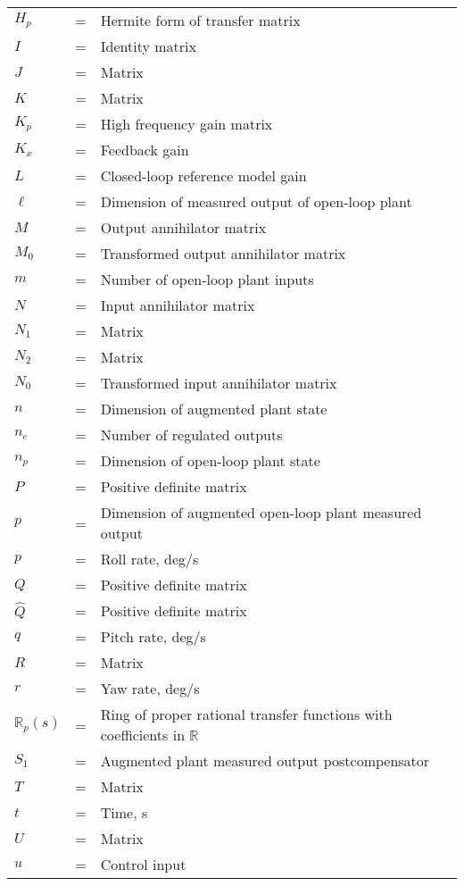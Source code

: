 \documentclass[]{../sty/JGCD}
\theoremstyle{examplestyle}
\begin{document}
\begin{longtable}[l]{@{}lcl@{}}
    $H_{p}$ &=& Hermite form of transfer matrix \\
    $I$ &=& Identity matrix \\
    $J$ &=& Matrix \\
    $K$ &=& Matrix \\
    $K_{p}$ &=& High frequency gain matrix \\
    $K_{x}$ &=& Feedback gain \\
    $L$ &=& Closed-loop reference model gain \\
    $\ell$ &=& Dimension of measured output of open-loop plant \\
    $M$ &=& Output annihilator matrix \\
    $M_{0}$ &=& Transformed output annihilator matrix \\
    $m$ &=& Number of open-loop plant inputs \\
    $N$ &=& Input annihilator matrix \\
    $N_{1}$ &=& Matrix \\
    $N_{2}$ &=& Matrix \\
    $N_{0}$ &=& Transformed input annihilator matrix \\
    $n$ &=& Dimension of augmented plant state \\
    $n_{e}$ &=& Number of regulated outputs \\
    $n_{p}$ &=& Dimension of open-loop plant state \\
    $P$ &=& Positive definite matrix \\
    $p$ &=& Dimension of augmented open-loop plant measured output \\
    $p$ &=& Roll rate, deg/s \\
    $Q$ &=& Positive definite matrix \\
    $\widehat{Q}$ &=& Positive definite matrix \\
    $q$ &=& Pitch rate, deg/s \\
    $R$ &=& Matrix \\
    $r$ &=& Yaw rate, deg/s \\
    $\mathbb{R}_{p}(s)$ &=& Ring of proper rational transfer functions with coefficients in $\mathbb{R}$ \\
    $S_{1}$ &=& Augmented plant measured output postcompensator \\
    $T$ &=& Matrix \\
    $t$ &=& Time, s \\
    $U$ &=& Matrix \\
    $u$ &=& Control input \\

\end{longtable}
\end{document}
